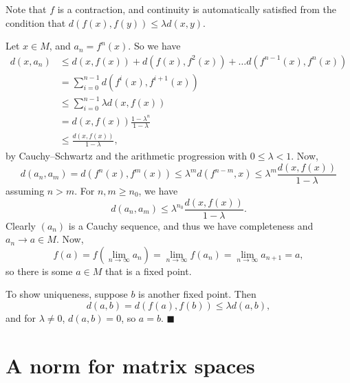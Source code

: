 \documentclass[letter-paper]{tufte-book}
\newenvironment{proof}[1][Proof]{\begin{trivlist}
\item[\hskip \labelsep {\bfseries #1}]}{\end{trivlist}}
\newcommand{\qed}{\hfill$\blacksquare$}
\begin{document}
\begin{proof}
  Note that $f$ is a contraction, and continuity is automatically satisfied from
  the condition that $d(f(x), f(y)) \leq \lambda d(x,y)$.
  
  Let $x\in M$, and $a_n = f^n(x)$. So we have
  \begin{align*}
    d(x, a_n) &\leq d(x, f(x)) + d(f(x), f^2(x)) + \ldots d(f^{n-1}(x), f^n(x)) \\
      &= \sum_{i=0}^{n-1} d(f^i(x), f^{i+1}(x))\\
      &\leq \sum_{i=0}^{n-1} \lambda d(x, f(x))\\
      &= d(x, f(x)) \frac{1-\lambda^n}{1 - \lambda}\\
      &\leq \frac{d(x, f(x))}{1 - \lambda},
  \end{align*}
  by Cauchy--Schwartz and the arithmetic progression with $0\leq\lambda< 1$.
  Now,
  \begin{equation*}
    d(a_n, a_m) = d(f^n(x), f^m(x)) \leq \lambda^m d(f^{n-m}, x) \leq \lambda^m \frac{d(x, f(x))}{1-\lambda}
  \end{equation*}
  assuming $n>m$. For $n,m \geq n_0$, we have
  \begin{equation*}
    d(a_n, a_m) \leq \lambda^{n_0} \frac{d(x, f(x))}{1-\lambda}.
  \end{equation*}
  Clearly $(a_n)$ is a Cauchy sequence, and thus we have completeness and $a_n
  \to a \in M$. Now,
  \begin{equation*}
    f(a) = f\left(\lim_{n\to\infty} a_n\right) = \lim_{n\to\infty} f(a_n) = \lim_{n\to\infty} a_{n+1} = a,
  \end{equation*}
  so there is some $a\in M$ that is a fixed point.
  
  To show uniqueness, suppose $b$ is another fixed point. Then
  \begin{equation*}
    d(a,b) = d(f(a), f(b)) \leq \lambda d(a,b),
  \end{equation*}
  and for $\lambda \neq 0$, $d(a,b)=0$, so $a=b$. \qed
\end{proof}


\section{A norm for matrix spaces}
\end{document}
